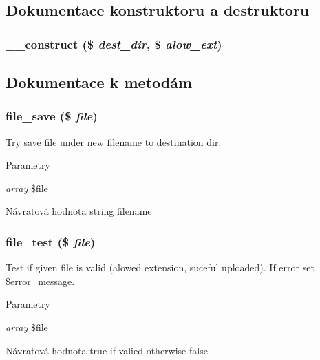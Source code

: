 \subsection{Dokumentace konstruktoru a destruktoru}
\subsubsection[{\_\-\_\-construct}]{\setlength{\rightskip}{0pt plus 5cm}\_\-\_\-construct (\$ {\em dest\_\-dir}, \/  \$ {\em alow\_\-ext})}\label{d4/d3b/class_uploader_ae1a052bcca50ede168f0322681d07816}


\subsection{Dokumentace k metodám}
\subsubsection[{file\_\-save}]{\setlength{\rightskip}{0pt plus 5cm}file\_\-save (\$ {\em file})\hspace{0.3cm}{\ttfamily  [private]}}\label{d4/d3b/class_uploader_a7c81a26c313a5ac0bb0f92146e4b61fd}
Try save file under new filename to destination dir. 
\begin{DoxyParams}{Parametry}
\item[{\em array}]\$file \end{DoxyParams}
\begin{DoxyReturn}{Návratová hodnota}
string filename 
\end{DoxyReturn}
\subsubsection[{file\_\-test}]{\setlength{\rightskip}{0pt plus 5cm}file\_\-test (\$ {\em file})\hspace{0.3cm}{\ttfamily  [private]}}\label{d4/d3b/class_uploader_a9a725aa5015620671e1b7e12f41f89cd}
Test if given file is valid (alowed extension, suceful uploaded). If error set \$error\_\-message. 
\begin{DoxyParams}{Parametry}
\item[{\em array}]\$file \end{DoxyParams}
\begin{DoxyReturn}{Návratová hodnota}
true if valied otherwise false 
\end{DoxyReturn}
